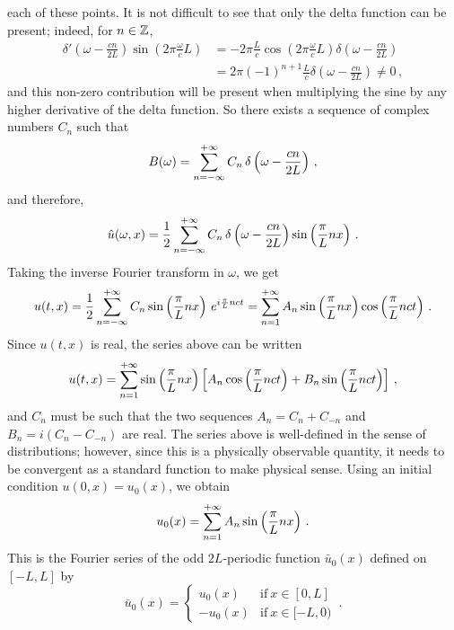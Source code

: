 each of these points. It is not difficult to see that only the delta function can be
present; indeed, for $n\in\mathbb{Z}$,
\begin{align}
  \delta'\left(\omega-\frac{cn}{2L}\right)\sin\left(2\pi\frac{\omega}{c}L\right)&=
  -2\pi\frac{L}{c}\cos\left(2\pi\frac{\omega}{c}L\right)
  \delta\left(\omega-\frac{cn}{2L}\right)\\
  &=2\pi (-1)^{n+1}\frac{L}{c}\delta\left(\omega-\frac{cn}{2L}\right)\neq 0\,,
\end{align}
and this non-zero contribution will be present when multiplying the sine by any higher
derivative of the delta function. So there exists a sequence of complex numbers $C_n$ such
that
\begin{equation}
  B(\omega)=\sum_{n=-\infty}^{+\infty}C_n\,\delta\left(\omega-\frac{cn}{2L}\right)\,,
\end{equation}
and therefore,
\begin{equation}
  \hat{u}(\omega,x)=\frac12\sum_{n=-\infty}^{+\infty}C_n\,\delta\left(\omega-\frac{cn}{2L}\right)
  \sin\left(\frac{\pi}{L}nx\right)\,.
\end{equation}
Taking the inverse Fourier transform in $\omega$, we get
\begin{equation}
  u(t,x)=\frac12\sum_{n=-\infty}^{+\infty}C_n\sin\left(\frac{\pi}{L}nx\right)\,e^{i\frac{\pi}{L}nct}=
  \sum_{n=1}^{+\infty}A_n\sin\left(\frac{\pi}{L}nx\right)\cos\left(\frac{\pi}{L}nct\right)\,.
\end{equation}
Since $u(t,x)$ is real, the series above can be written
\begin{equation}
  u(t,x)=\sum_{n=1}^{+\infty}\sin\left(\frac{\pi}{L}nx\right)\left[
  A_n\cos\left(\frac{\pi}{L}nct\right)+B_n\sin\left(\frac{\pi}{L}nct\right)\right]\,,
\end{equation}
and $C_n$ must be such that the two sequences $A_n=C_n+C_{-n}$ and $B_n=i(C_{n}-C_{-n})$
are real. The series above is well-defined in the sense of distributions; however, since
this is a physically observable quantity, it needs to be convergent as a standard function
to make physical sense. Using an initial condition $u(0,x)=u_0(x)$, we obtain
\begin{equation}
  u_0(x)=\sum_{n=1}^{+\infty}A_n\sin\left(\frac{\pi}{L}nx\right)\,.
  \label{eq:u0-fourier}
\end{equation}
This is the Fourier series of the odd $2L$-periodic function $\bar{u}_0(x)$ defined on
$[-L,L]$ by
\begin{equation}
  \bar{u}_0(x)=
  \begin{cases}
    u_0(x)&\text{if}~x\in[0,L]\\
    -u_0(x)&\text{if}~x\in[-L,0)
  \end{cases}
  \,.
\end{equation}
